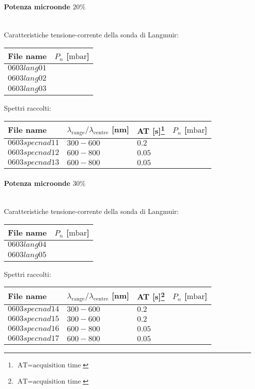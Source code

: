 \paragraph*{Potenza microonde $\text{20\%}$} ~\\
Caratteristiche tensione-corrente della sonda di Langmuir:
\begin{center}
\begin{tabular}{p{3cm}p{3cm}}
\toprule
File name	&$P_{n}$ [$\si{\milli\bar}$]\\
\midrule
$0603lang01$	&$   $\\
$0603lang02$	&$   $\\
$0603lang03$	&$   $\\
\bottomrule
\end{tabular}
\end{center}

Spettri raccolti:
\begin{center}
\begin{tabular}{p{3cm}p{4cm}p{2cm}p{3cm}}
\toprule
File name	&$\lambda_\text{range}\text{/}\lambda_\text{centre}$ [nm] &AT [s]\footnote{$\text{AT}=\text{acquisition time}$} &$P_{n}$ [$\si{\milli\bar}$]\\
\midrule
$0603specnad11$	&$300-600$	&$0.2$		&$  $\\
$0603specnad12$	&$600-800$	&$0.05$		&$  $\\
$0603specnad13$	&$600-800$	&$0.05$		&$  $\\
\bottomrule
\end{tabular}
\end{center}

\paragraph*{Potenza microonde $\text{30\%}$} ~\\
Caratteristiche tensione-corrente della sonda di Langmuir:
\begin{center}
  \begin{tabular}{p{3cm}p{3cm}}
  \toprule
File name	&$P_{n}$ [$\si{\milli\bar}$]\\
  \midrule
$0603lang04$	&$  $\\
$0603lang05$	&$  $\\
  \bottomrule
  \end{tabular}
\end{center}

Spettri raccolti:
\begin{center}
\begin{tabular}{p{3cm}p{4cm}p{2cm}p{3cm}}
\toprule
File name	&$\lambda_\text{range}\text{/}\lambda_\text{centre}$ [nm] &AT [s]\footnote{$\text{AT}=\text{acquisition time}$} &$P_{n}$ [$\si{\milli\bar}$]\\
\midrule
$0603specnad14$	&$300-600$	&$0.2$		&$  $\\
$0603specnad15$	&$300-600$	&$0.2$		&$  $\\
$0603specnad16$	&$600-800$	&$0.05$		&$  $\\
$0603specnad17$	&$600-800$	&$0.05$		&$  $\\
\bottomrule
\end{tabular}
\end{center}


